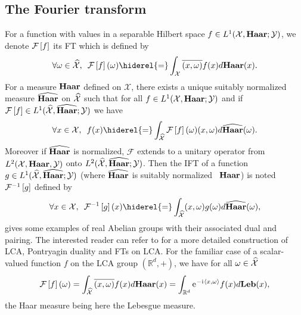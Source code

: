 \subsection{The Fourier transform}
For a function with values in a separable Hilbert space $f\in L^1(\mathcal{X},\mathbf{Haar};\mathcal{Y})$, we denote $\mathcal{F}\left[f\right]$ its \acf{FT} which is defined by
\begin{dmath*}
    \forall \omega \in \dual{\mathcal{X}},\enskip \FT{f}(\omega) \hiderel{=}\int_{\mathcal{X}} \conj{\pairing{x,\omega}}f(x)d\Haar(x).
\end{dmath*}
For a measure $\mathbf{Haar}$ defined on $\mathcal{X}$, there exists a unique suitably normalized measure $\widehat{\mathbf{Haar}}$ on $\widehat{\mathcal{X}}$ such that for all $f \in L^1(\mathcal{X}, \mathbf{Haar};\mathcal{Y})$ and if $\mathcal{F}\left[f\right] \in L^1(\widehat{\mathcal{X}}, \widehat{\mathbf{Haar}}; \mathcal{Y})$ we have
\begin{dmath}\label{fourier-l1}
\forall x \in \mathcal{X},\enskip f(x)\hiderel{=}\int_{\dual{\mathcal{X}}}\FT{f}(\omega)(x,\omega) d\dual{\Haar}(\omega).
\end{dmath}
Moreover if $\widehat{\mathbf{Haar}}$ is normalized, $\mathcal{F}$ extends to a unitary operator from $L^2(\mathcal{X}, \mathbf{Haar}, \mathcal{Y})$ onto $L^2(\widehat{\mathcal{X}}, \widehat{\mathbf{Haar}}; \mathcal{Y})$. Then the \acf{IFT} of a function $g\in L^1(\widehat{\mathcal{X}},\widehat{\mathbf{Haar}}; \mathcal{Y})$ (where $\widehat{\mathbf{Haar}}$ is suitably normalized \wrt~$\mathbf{Haar}$) is noted $\mathcal{F}^{-1}\left[g\right]$ defined by
\begin{dmath*}
    \forall x \in \mathcal{X},\enskip \IFT{g}(x) \hiderel{=} \int_{\dual{\mathcal{X}}} \pairing{x,\omega}g(\omega) d\dual{\Haar}(\omega),
\end{dmath*}
 gives some examples of real Abelian groups with their associated dual and pairing. The interested reader can refer to \citet{folland1994course} for a more detailed construction of LCA, Pontryagin duality and \acl{FT}s on LCA. For the familiar case of a scalar-valued function $f$ on the \acs{LCA} group $(\mathbb{R}^d, +)$, we have for all $\omega\in \widehat{\mathcal{X}}$
\begin{dmath}
\label{fourier-R-plus}
\FT{f}(\omega)
=\int_{\dual{\mathcal{X}}} \conj{\pairing{x,\omega}}f(x)d\Haar(x)
=\int_{\mathbb{R}^d} \ec^{-\iu \inner{x,\omega}}f(x) d\Leb(x),
\end{dmath}
the Haar measure being here the Lebesgue measure.

